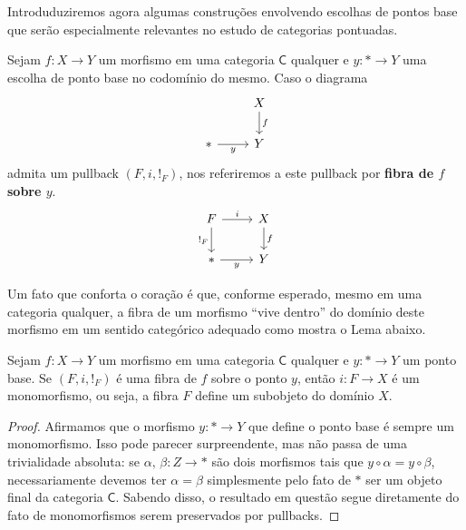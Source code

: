 Introduduziremos agora algumas construções envolvendo escolhas de pontos base que serão especialmente relevantes no estudo de categorias pontuadas.

\begin{defin}\label{defin:fibra_sobre_ponto_base}
  Sejam $f: X \to Y$ um morfismo em uma categoria $\mathsf{C}$ qualquer e $y: * \to Y$ uma escolha de ponto base no codomínio do mesmo.
  Caso o diagrama
  \begin{displaymath}
    \begin{tikzcd}
      & X
      \arrow[d, "f"]
      \\ *
      \arrow[r, "y" swap]
      & Y
    \end{tikzcd}
  \end{displaymath}
  admita um pullback $(F,i,!_{F})$, nos referiremos a este pullback por \textbf{fibra de $f$ sobre $y$}.
  \begin{displaymath}
    \begin{tikzcd}
      F
      \arrow[r, "i"]
      \arrow[d, "!_{F}" swap]
      & X
      \arrow[d, "f"]
      \\ *
      \arrow[r, "y" swap]
      & Y
    \end{tikzcd}
  \end{displaymath}
\end{defin}

Um fato que conforta o coração é que, conforme esperado, mesmo em uma categoria qualquer, a fibra de um morfismo ``vive dentro'' do domínio deste morfismo em um sentido categórico adequado como mostra o Lema abaixo.

\begin{lema}\label{lema:fibra_define_subobjeto}
  Sejam $f: X \to Y$ um morfismo em uma categoria $\mathsf{C}$ qualquer e $y: * \to Y$ um ponto base.
  Se $(F,i,!_{F})$ é uma fibra de $f$ sobre o ponto $y$, então $i: F \to X$ é um monomorfismo, ou seja, a fibra $F$ define um subobjeto do domínio $X$.
\end{lema}

\begin{proof}
  Afirmamos que o morfismo $y: * \to Y$ que define o ponto base é sempre um monomorfismo.
  Isso pode parecer surpreendente, mas não passa de uma trivialidade absoluta: se $\alpha,\, \beta: Z \to *$ são dois morfismos tais que $y \circ \alpha = y \circ \beta$, necessariamente devemos ter $\alpha = \beta$ simplesmente pelo fato de $*$ ser um objeto final da categoria $\mathsf{C}$.
  Sabendo disso, o resultado em questão segue diretamente do fato de monomorfismos serem preservados por pullbacks.
\end{proof}

